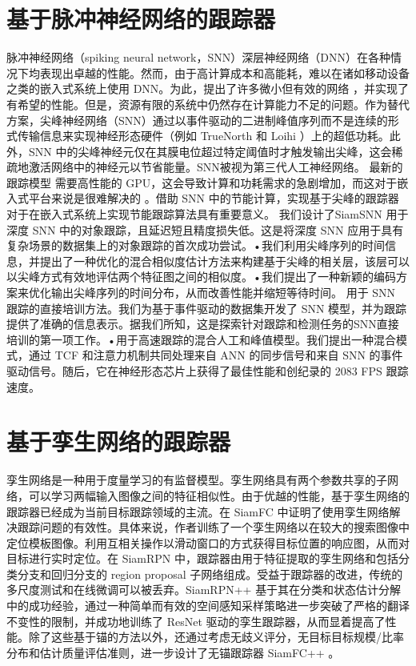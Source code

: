\section{基于脉冲神经网络的跟踪器}%
脉冲神经网络（spiking neural network，SNN）深层神经网络（DNN）在各种情况下均表现出卓越的性能。然而，由于高计算成本和高能耗，难以在诸如移动设备之类的嵌入式系统上使用 DNN。为此，提出了许多微小但有效的网络 \cite{wei2018quantization}，并实现了有希望的性能。但是，资源有限的系统中仍然存在计算能力不足的问题。作为替代方案，尖峰神经网络（SNN）通过以事件驱动的二进制峰值序列而不是连续的形式传输信息来实现神经形态硬件（例如 TrueNorth \cite{merolla2014million} 和 Loihi  \cite{davies2018loihi}）上的超低功耗。此外，SNN 中的尖峰神经元仅在其膜电位超过特定阈值时才触发输出尖峰，这会稀疏地激活网络中的神经元以节省能量。SNN被视为第三代人工神经网络。
最新的跟踪模型 \cite{SiamFC,SiamRPN} 需要高性能的 GPU，这会导致计算和功耗需求的急剧增加，而这对于嵌入式平台来说是很难解决的 \cite{basu2018low}。借助 SNN 中的节能计算，实现基于尖峰的跟踪器对于在嵌入式系统上实现节能跟踪算法具有重要意义。\cite{SiamSNN} 我们设计了SiamSNN 用于深度 SNN 中的对象跟踪，且延迟短且精度损失低。这是将深度 SNN 应用于具有复杂场景的数据集上的对象跟踪的首次成功尝试。•我们利用尖峰序列的时间信息，并提出了一种优化的混合相似度估计方法来构建基于尖峰的相关层，该层可以以尖峰方式有效地评估两个特征图之间的相似度。•我们提出了一种新颖的编码方案来优化输出尖峰序列的时间分布，从而改善性能并缩短等待时间。
\cite{DashNet} 用于 SNN 跟踪的直接培训方法。我们为基于事件驱动的数据集开发了 SNN 模型，并为跟踪提供了准确的信息表示。据我们所知，这是探索针对跟踪和检测任务的SNN直接培训的第一项工作。•用于高速跟踪的混合人工和峰值模型。我们提出一种混合模式，通过 TCF 和注意力机制共同处理来自 ANN 的同步信号和来自 SNN 的事件驱动信号。随后，它在神经形态芯片上获得了最佳性能和创纪录的 2083 FPS 跟踪速度。%
\section{基于孪生网络的跟踪器}
孪生网络是一种用于度量学习的有监督模型。孪生网络具有两个参数共享的子网络，可以学习两幅输入图像之间的特征相似性。由于优越的性能，基于孪生网络的跟踪器已经成为当前目标跟踪领域的主流。在 SiamFC \cite{SiamFC} 中证明了使用孪生网络解决跟踪问题的有效性。具体来说，作者训练了一个孪生网络以在较大的搜索图像中定位模板图像。利用互相关操作以滑动窗口的方式获得目标位置的响应图，从而对目标进行实时定位。在 SiamRPN \cite{SiamRPN} 中，跟踪器由用于特征提取的孪生网络和包括分类分支和回归分支的 region proposal 子网络组成。受益于跟踪器的改进，传统的多尺度测试和在线微调可以被丢弃。SiamRPN++ \cite{SiamRPN++} 基于其在分类和状态估计分解中的成功经验，通过一种简单而有效的空间感知采样策略进一步突破了严格的翻译不变性的限制，并成功地训练了 ResNet 驱动的孪生跟踪器，从而显着提高了性能。除了这些基于锚的方法以外，还通过考虑无歧义评分，无目标目标规模/比率分布和估计质量评估准则，进一步设计了无锚跟踪器 SiamFC++ \cite{SiamFC++}。
